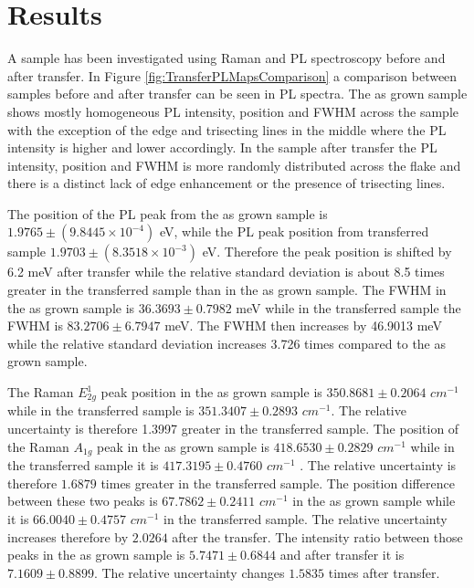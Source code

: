 \section{Results}
	
	A sample has been investigated using Raman and PL spectroscopy before and after transfer. In Figure \ref{fig:TransferPLMapsComparison} a comparison between samples before and after transfer can be seen in PL spectra. The as grown sample shows mostly homogeneous PL intensity, position and FWHM across the sample with the exception of the edge and trisecting lines in the middle where the PL intensity is higher and lower accordingly. In the sample after transfer the PL intensity, position and FWHM is more randomly distributed across the flake and there is a distinct lack of edge enhancement or the presence of trisecting lines.
	
	The position of the PL peak from the as grown sample is $1.9765 \pm (9.8445 \times 10^{-4})$ eV, while the PL peak position from transferred sample $1.9703 \pm (8.3518 \times 10^{-3})$ eV. Therefore the peak position is shifted by 6.2 meV after transfer while the relative standard deviation is about 8.5 times greater in the transferred sample than in the as grown sample. The FWHM in the as grown sample is $36.3693 \pm 0.7982$ meV while in the transferred sample the FWHM is $83.2706 \pm 6.7947$ meV. The FWHM then increases by 46.9013 meV while the relative standard deviation increases 3.726 times compared to the as grown sample.

	The Raman $E^1_{2g}$ peak position in the as grown sample is $350.8681 \pm 0.2064$ $cm^{-1}$ while in the transferred sample is $351.3407 \pm 0.2893$ $cm^{-1}$. The relative uncertainty is therefore 1.3997 greater in the transferred sample. The position of the Raman $A_{1g}$ peak in the as grown sample is $418.6530 \pm 0.2829$ $cm^{-1}$ while in the transferred sample it is $417.3195 \pm 0.4760$ $cm^{-1}$ . The relative uncertainty is therefore $1.6879$ times greater in the transferred sample. The position difference between these two peaks is $67.7862 \pm 0.2411$ $cm^{-1}$ in the as grown sample while it is $66.0040 \pm 0.4757$ $cm^{-1}$ in the transferred sample. The relative uncertainty increases therefore by $2.0264$ after the transfer. The intensity ratio between those peaks in the as grown sample is $5.7471 \pm 0.6844$ and after transfer it is $7.1609 \pm 0.8899$. The relative uncertainty changes $1.5835$ times after transfer.
	
